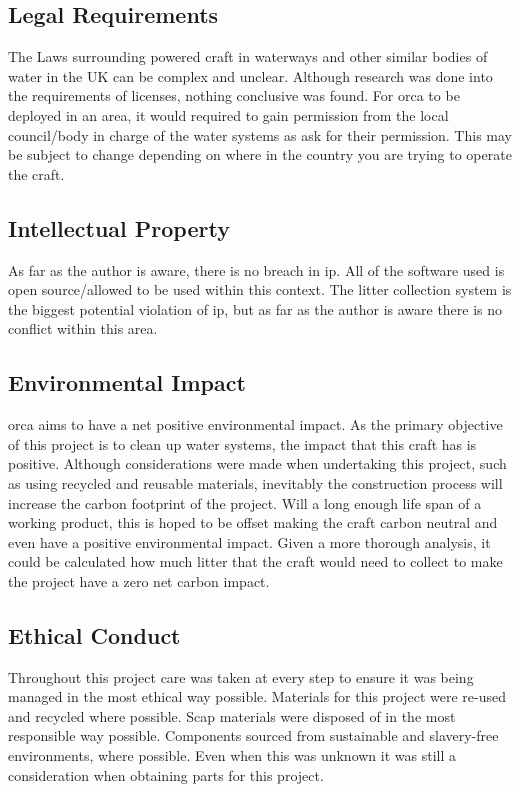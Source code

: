 \documentclass [11pt]{article}
\begin{document}
\subsection{Legal Requirements}
The Laws surrounding powered craft in waterways and other similar bodies of water in the UK can be complex and unclear. Although research was done into the requirements of licenses, nothing conclusive was found. For \gls{orca} to be deployed in an area, it would required to gain permission from the local council/body in charge of the water systems as ask for their permission. This may be subject to change depending on where in the country you are trying to operate the craft. 

\subsection{Intellectual Property}
As far as the author is aware, there is no breach in \gls{ip}. All of the software used is open source/allowed to be used within this context. The litter collection system is the biggest potential violation of \gls{ip}, but as far as the author is aware there is no conflict within this area.


\subsection{Environmental Impact}
\gls{orca} aims to have a net positive environmental impact. As the primary objective of this project is to clean up water systems, the impact that this craft has is positive. Although considerations were made when undertaking this project, such as using recycled and reusable materials, inevitably the construction process will increase the carbon footprint of the project. Will a long enough life span of a working product, this is hoped to be offset making the craft carbon neutral and even have a positive environmental impact.  Given a more thorough analysis, it could be calculated how much litter that the craft would need to collect to make the project have a zero net carbon impact.  

\subsection{Ethical Conduct}
Throughout this project care was taken at every step to ensure it was being managed in the most ethical way possible. Materials for this project were re-used and recycled where possible. Scap materials were disposed of in the most responsible way possible. Components sourced from sustainable and slavery-free environments, where possible. Even when this was unknown it was still a consideration when obtaining parts for this project.  
\end{document}
